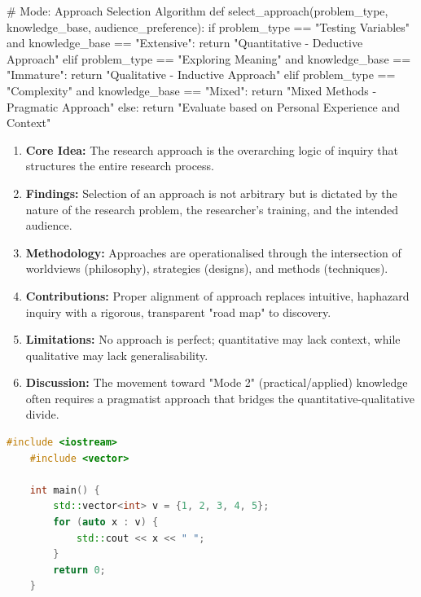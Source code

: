 \documentclass{report}
\begin{document}
\begin{}[python3]
    #  Mode: Approach Selection Algorithm
    def select_approach(problem_type, knowledge_base, audience_preference):
    if problem_type == "Testing Variables" and knowledge_base == "Extensive":
    return "Quantitative - Deductive Approach"
    elif problem_type == "Exploring Meaning" and knowledge_base == "Immature":
    return "Qualitative - Inductive Approach"
    elif problem_type == "Complexity" and knowledge_base == "Mixed":
    return "Mixed Methods - Pragmatic Approach"
    else:
    return "Evaluate based on Personal Experience and Context"
\end{}

\begin{paper}
    \begin{enumerate}
        \item \textbf{Core Idea:} The research approach is the overarching logic of inquiry that structures the entire research process.
        \item \textbf{Findings:} Selection of an approach is not arbitrary but is dictated by the nature of the research problem, the researcher's training, and the intended audience.
        \item \textbf{Methodology:} Approaches are operationalised through the intersection of worldviews (philosophy), strategies (designs), and methods (techniques).
        \item \textbf{Contributions:} Proper alignment of approach replaces intuitive, haphazard inquiry with a rigorous, transparent "road map" to discovery.
        \item \textbf{Limitations:} No approach is perfect; quantitative may lack context, while qualitative may lack generalisability.
        \item \textbf{Discussion:} The movement toward "Mode 2" (practical/applied) knowledge often requires a pragmatist approach that bridges the quantitative-qualitative divide.
    \end{enumerate}
\end{paper}

\begin{lstlisting}[style=tokyonight, language=CPP, caption=C++ example]
    #include <iostream>
    #include <vector>
    
    int main() {
        std::vector<int> v = {1, 2, 3, 4, 5};
        for (auto x : v) {
            std::cout << x << " ";
        }
        return 0;
    }
\end{lstlisting}
\end{document}
